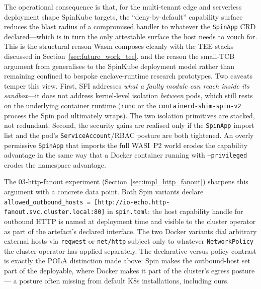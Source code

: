 \begin{sloppypar}
The operational consequence is that, for the multi-tenant edge and serverless deployment shape SpinKube targets, the ``deny-by-default'' capability surface reduces the blast radius of a compromised handler to whatever the \texttt{SpinApp} \acs{CRD} declared---which is in turn the only attestable surface the host needs to vouch for. This is the structural reason \acs{Wasm} composes cleanly with the \acf{TEE} stacks discussed in Section~\ref{sec:future_work_tee}, and the reason the small-\acs{TCB} argument from \textcite{menetrey2021twine, menetrey2022watz} generalises to the SpinKube deployment model rather than remaining confined to bespoke enclave-runtime research prototypes. Two caveats temper this view. First, \acs{SFI} addresses \emph{what a faulty module can reach inside its sandbox}---it does not address kernel-level isolation \emph{between} pods, which still rests on the underlying container runtime (\texttt{runc} or the \texttt{containerd-shim-spin-v2} process the Spin pod ultimately wraps). The two isolation primitives are stacked, not redundant. Second, the security gains are realised only if the \texttt{SpinApp} import list and the pod's \texttt{ServiceAccount}/RBAC posture are both tightened. An overly permissive \texttt{SpinApp} that imports the full \acs{WASI}~P2 world erodes the capability advantage in the same way that a Docker container running with \texttt{--privileged} erodes the namespace advantage.
\end{sloppypar}

\begin{sloppypar}
The 03-http-fanout experiment (Section~\ref{sec:impl_http_fanout}) sharpens this argument with a concrete data point. Both Spin variants declare \texttt{allowed\_outbound\_hosts~=~[\textquotedbl http://io-echo.http-fanout.svc.cluster.local:80\textquotedbl ]} in \texttt{spin.toml}: the host capability handle for outbound \acs{HTTP} is named at deployment time and visible to the cluster operator as part of the artefact's declared interface. The two Docker variants dial arbitrary external hosts via \texttt{reqwest} or \texttt{net/http} subject only to whatever \texttt{NetworkPolicy} the cluster operator has applied separately. The declarative-versus-policy contrast is exactly the \acs{POLA} distinction made above: Spin makes the outbound-host set part of the deployable, where Docker makes it part of the cluster's egress posture --- a posture often missing from default \acs{K8s} installations, including ours.
\end{sloppypar}

